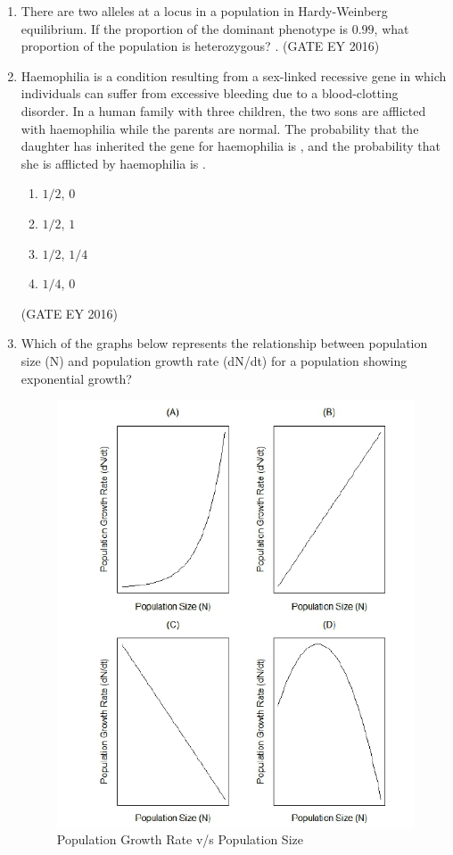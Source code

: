 \documentclass[journal]{IEEEtran}
\begin{document}
\begin{enumerate}[label=Q.\arabic*.]
\item There are two alleles at a locus in a population in Hardy-Weinberg equilibrium. If the proportion of the dominant phenotype is $0.99$, what proportion of the population is heterozygous? \underline{\hspace{3cm}}.
\hfill{(GATE EY 2016)}

\item Haemophilia is a condition resulting from a sex-linked recessive gene in which individuals can suffer from excessive bleeding due to a blood-clotting disorder. In a human family with three children, the two sons are afflicted with haemophilia while the parents are normal. The probability that the daughter has inherited the gene for haemophilia is \underline{\hspace{1cm}}, and the probability that she is afflicted by haemophilia is \underline{\hspace{1cm}}.
\begin{multicols}{2}
\begin{enumerate}
    \item $1/2$, $0$
    \item $1/2$, $1$
    \item $1/2$, $1/4$
    \item $1/4$, $0$
\end{enumerate}
\end{multicols}
\hfill{(GATE EY 2016)}

\item Which of the graphs below represents the relationship between population size (N) and population growth rate (dN/dt) for a population showing exponential growth? 
\begin{figure}
    \centering
    \includegraphics[width=0.7\linewidth]{figs/Q-41.png}
    \caption{Population Growth Rate v/s Population Size}
    \label{Fig.5}
\end{figure}


\end{enumerate}
\end{document}
